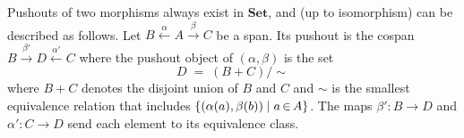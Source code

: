 \begin{example}
    \label{ex:cat:posfjsdlkgja}
     Pushouts of two morphisms always exist in \(\mathbf{Set}\), and (up to isomorphism) can be described as follows. Let
    \( B \overset{\alpha}{\leftarrow} A \overset{\beta}{\rightarrow} C \) be a span. Its pushout is the cospan \( B \overset{\beta'}{\rightarrow} D \overset{\alpha'}{\leftarrow} C \) where the pushout object of \((\alpha,\beta)\) is the set
    \[
    D \;=\; (B\mathop{+}C)/{\sim}
    \]
    where \(B\mathop{+}C\) denotes the disjoint union of $B$ and $C$ and \(\sim\) is the smallest equivalence relation that includes \(\{(\alpha(a),\beta(b))\mid a \mathop{\in} A \}\). The maps
    \(\beta' \mathop{\colon} B \mathop{\to} D\) and \(\alpha' \mathop{\colon} C \mathop{\to} D\) send each element to its equivalence class.


\end{example}

